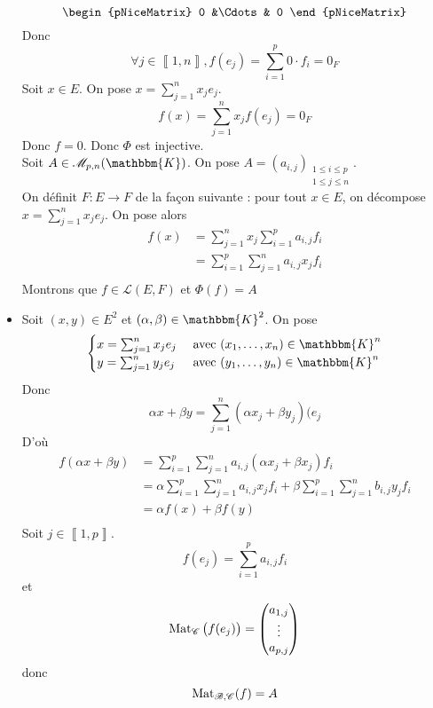 \begin{prv}
\begin{itemize}
\[\begin{pNiceMatrix}
					0 &\Cdots& 0
				\end{pNiceMatrix}
			\] %
			Donc \[
				\forall j \in \left\llbracket 1,n \right\rrbracket, f(e_j) = \sum_{i=1}^p 0 \cdot f_i = 0_F
			\] Soit $x \in E$. On pose $x = \sum_{j=1}^n x_j e_j$. \[
				f(x) = \sum_{j=1}^n x_j f(e_j) = 0_F
			\] Donc $f = 0$. Donc $\Phi$ est injective.\\
			Soit $A \in \mathcal{M}_{p,n}(\mathbbm{K})$. On pose $A = (a_{i,j})_{\substack{1\le i\le p\\1\le j\le n}}$.\\
			On définit $F : E \to  F$ de la fa\c con suivante : pour tout $x \in E$, on décompose $x = \sum_{j=1}^n x_j e_j$. On pose alors
			\begin{align*}
				f(x) &= \sum_{j=1}^n x_j \sum_{i=1}^p a_{i,j}f_i \\
				&= \sum_{i=1}^p \sum_{j=1}^n a_{i,j} x_j f_i \\
			\end{align*} Montrons que $f \in \mathcal{L}(E,F)$ et $\Phi(f) = A$ 
		\item Soit $(x,y) \in E^2$ et $(\alpha, \beta) \in \mathbbm{K}^2$. On pose \[
				\begin{cases}
					x = \sum_{j=1}^n x_j e_j &\text{ avec } (x_1, \ldots, x_n) \in \mathbbm{K}^n\\
					y = \sum_{j=1}^n y_j e_j &\text{ avec } (y_1, \ldots, y_n) \in \mathbbm{K}^n\\
				\end{cases}
			\] Donc \[
				\alpha x + \beta y = \sum_{j=1}^n (\alpha x_j + \beta y_j)(e_j
			\] D'où
			\begin{align*}
				f(\alpha x + \beta y) &= \sum_{i=1}^p \sum_{j=1}^n a_{i,j}(\alpha x_j + \beta x_j)f_i \\
				&= \alpha \sum_{i=1}^p \sum_{j=1}^n a_{i,j} x_j f_i + \beta \sum_{i=1}^p \sum_{j=1}^n b_{i,j} y_j f_i \\
				&= \alpha f(x) + \beta f(y) \\
			\end{align*}
			Soit $j \in \left\llbracket 1,p \right\rrbracket$. \[
				f(e_j) = \sum_{i=1}^p a_{i,j}f_i
			\] et \[
				\operatorname{Mat}_{\mathcal{C}}\big(f(e_j)\big) = \begin{pmatrix}
					a_{1,j}\\
					\vdots\\
					a_{p,j}
				\end{pmatrix} 
			\] donc \[
				\operatorname{Mat}_{\mathcal{B},\mathcal{C}}(f) = A
			\]
	\end{itemize}
\end{prv}

